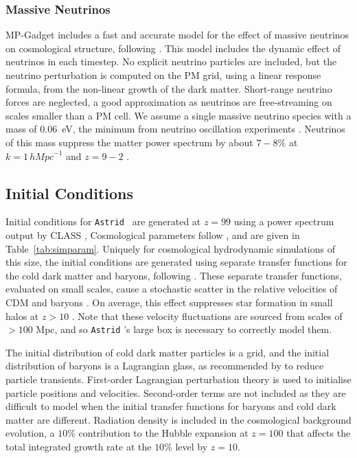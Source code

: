 \documentclass[fleqn,usenatbib]{mnras}
\newcommand{\hMpc}{\,h\unit{Mpc}^{-1}}
\def\astrid{\texttt{Astrid} }
\begin{document}
\subsubsection{Massive Neutrinos}
\label{sec:neutrinos}

MP-Gadget includes a fast and accurate model for the effect of massive neutrinos on cosmological structure, following \cite{Yacine:2013}. This model includes the dynamic effect of neutrinos in each timestep.
No explicit neutrino particles are included, but the neutrino perturbation is computed on the PM grid, using a linear response formula, from the non-linear growth of the dark matter. Short-range neutrino forces are neglected, a good approximation as neutrinos are free-streaming on scales smaller than a PM cell. 
We assume a single massive neutrino species with a mass of $0.06$~eV, the minimum from neutrino oscillation experiments \citep{deSalas:2018}. Neutrinos of this mass suppress the matter power spectrum by about $7-8\%$ at $k = 1 \hMpc$ and $z=9 - 2$ \citep{Bird:2018}.

\subsection{Initial Conditions}
\label{sec:ics}

Initial conditions for \astrid~are generated at $z=99$ using a power spectrum output by CLASS \citep{CLASS}, Cosmological parameters follow \cite{Planck}, and are given in Table~\ref{tab:simparam}. Uniquely for cosmological hydrodynamic simulations of this size, the initial conditions are generated using separate transfer functions for the cold dark matter and baryons, following \cite{Bird:2020}. These separate transfer functions, evaluated on small scales, cause a stochastic scatter in the relative velocities of CDM and baryons \citep{2010PhRvD..82h3520T}. On average, this effect suppresses star formation in small halos at $z> 10$ \citep[e.g~][]{Naoz:2007}. Note that these velocity fluctuations are sourced from scales of $> 100$ Mpc, and so \astrid's large box is necessary to correctly model them.

The initial distribution of cold dark matter particles is a grid, and the initial distribution of baryons is a Lagrangian glass, as recommended by \cite{Bird:2020} to reduce particle transients. First-order Lagrangian perturbation theory \citep{Zeldovich:1970, Crocce:2006} is used to initialise particle positions and velocities. Second-order terms are not included as they are difficult to model when the initial transfer functions for baryons and cold dark matter are different. Radiation density is included in the cosmological background evolution, a $10\%$ contribution to the Hubble expansion at $z=100$ that affects the total integrated growth rate at the $10\%$ level by $z=10$.
\end{document}
